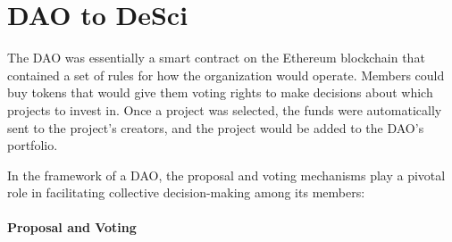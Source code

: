 \documentclass[lettersize,journal]{IEEEtran}
\begin{document}
  

\section{DAO to DeSci}

The DAO was essentially a smart contract on the Ethereum blockchain that contained a set of rules for how the organization would operate. Members could buy tokens that would give them voting rights to make decisions about which projects to invest in. Once a project was selected, the funds were automatically sent to the project's creators, and the project would be added to the DAO's portfolio.


In the framework of a DAO, the proposal and voting mechanisms play a pivotal role in facilitating collective decision-making among its members:

\paragraph{Proposal and Voting}
\end{document}
